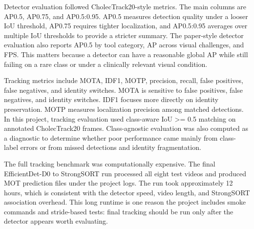 \documentclass[12pt,a4paper]{article}
\begin{document}
Detector evaluation followed CholecTrack20-style metrics. The main columns are AP0.5, AP0.75, and AP0.5:0.95. AP0.5 measures detection quality under a looser IoU threshold, AP0.75 requires tighter localization, and AP0.5:0.95 averages over multiple IoU thresholds to provide a stricter summary. The paper-style detector evaluation also reports AP0.5 by tool category, AP across visual challenges, and FPS. This matters because a detector can have a reasonable global AP while still failing on a rare class or under a clinically relevant visual condition.

Tracking metrics include MOTA, IDF1, MOTP, precision, recall, false positives, false negatives, and identity switches. MOTA is sensitive to false positives, false negatives, and identity switches. IDF1 focuses more directly on identity preservation. MOTP measures localization precision among matched detections. In this project, tracking evaluation used class-aware IoU >= 0.5 matching on annotated CholecTrack20 frames. Class-agnostic evaluation was also computed as a diagnostic to determine whether poor performance came mainly from class-label errors or from missed detections and identity fragmentation.

The full tracking benchmark was computationally expensive. The final EfficientDet-D0 to StrongSORT run processed all eight test videos and produced MOT prediction files under the project logs. The run took approximately 12 hours, which is consistent with the detector speed, video length, and StrongSORT association overhead. This long runtime is one reason the project includes smoke commands and stride-based tests: final tracking should be run only after the detector appears worth evaluating.

\begin{table}[H]\centering\small{}
\caption{YOLO11 baseline experiments.}
\end{table}
\end{document}
